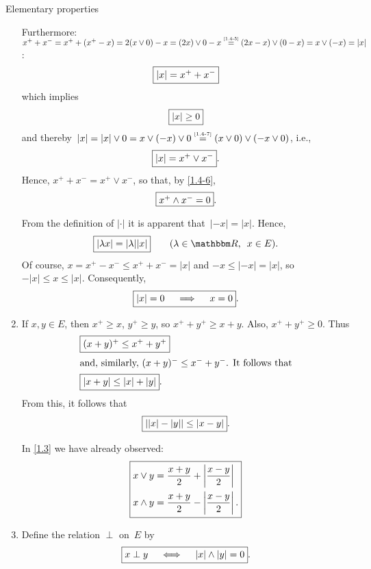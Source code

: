 \documentclass[main.tex]{subfiles}
\begin{document}
\begin{psec}{1.4}{Elementary properties}
\begin{enumerate}
Furthermore:
$x^+ + x^- 
= x^+ + (x^+ - x) 
= 2(x\vee 0) -x
= (2x)\vee 0 -x
\isref{1.4-5} (2x-x)\vee(0-x) = x\vee(-x) = |x|$:
\begin{equation*}
\fbox{$ |x| = x^+ + x^- $}
\end{equation*}
which implies
\begin{equation*}
\fbox{$ |x|\ge 0 $}
\end{equation*}
and 
thereby~$|x|=|x|\vee 0
= x\vee(-x)\vee 0 \isref{1.4-7} (x\vee 0) \vee (-x\vee 0)$,
i.e., 
\begin{equation*}
\fbox{$ |x| = x^+ \vee x^- $}
\text{.}
\end{equation*}
Hence, $x^+ + x^- = x^+ \vee x^-$,
so that, 
by \ref{1.4-6},
\begin{equation*}
\fbox{$ x^+ \wedge x^- = 0 $} 
\text{.}
\end{equation*}

From the definition of $|\cdot|$
it is apparent that~$|-x|=|x|$.
Hence, 
\begin{equation*}
\frmd{|\lambda x|=|\lambda| |x|} 
  \qquad (\lambda\in\R\htam{, }\ x\in E)\htam{.}
\end{equation*}
Of course,
$x=x^+ - x^-\leq x^+ + x^- = |x|$
and $-x\leq|-x|=|x|$,
so $-|x|\leq x \leq |x|$.
Consequently,
\begin{equation*}
\fbox{$ |x|=0 \quad \implies \quad x=0 $}
\text{.}
\end{equation*}
%
\item%
\label{1.4-10}
If $x,y\in E$,
then $x^+\geq x$, 
$y^+\geq y$,
so $x^+ + y^+ \geq x+y$.
Also,
$x^+ + y^+\geq 0$.
Thus
\begin{align*}
&\fbox{$ (x+y)^+ \leq x^+ + y^+ $}\\
\intertext{and, 
similarly, 
$(x+y)^- \leq x^- + y^-$.
It follows that}
&\fbox{$ |x+y|\leq|x|+|y| $}
\text{.}
\end{align*}
From this,
it follows that
\begin{equation*}
\fbox{$ ||x|-|y|| \leq |x-y| $}
\text{.}
\end{equation*}

In \ref{1.3} 
we have already observed:
\[ \fbox{$ 
\begin{aligned}
x \vee y 
  &= \frac{x+y}{2} + \left | \frac{x-y}{2} \right | \\
x \wedge y 
  &= \frac{x+y}{2} - \left | \frac{x-y}{2} \right | 
\text{.}
\end{aligned}  $} \]
%
\item
\label{1.4-11}
Define the relation $\perp$ on~$E$ by
\begin{equation*}
\fbox{$ x \perp y \quad \iff \quad |x|\wedge|y|=0 $}
\text{.}
\end{equation*}


\end{enumerate}
\end{psec}
\end{document}
